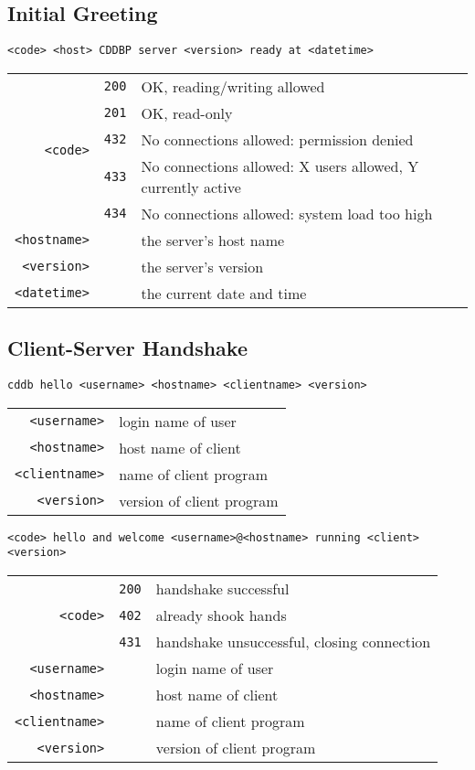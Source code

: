 \subsection{Initial Greeting}
\begin{Verbatim}[frame=single,label=\textit{From Server},showspaces=true]
<code> <host> CDDBP server <version> ready at <datetime>
\end{Verbatim}
\begin{tabular}{rcl}
\multirow{5}{3em}{\texttt{<code>}}
& \texttt{200} & OK, reading/writing allowed \\
& \texttt{201} & OK, read-only \\
& \texttt{432} & No connections allowed: permission denied \\
& \texttt{433} & No connections allowed: X users allowed, Y currently active \\
& \texttt{434} & No connections allowed: system load too high \\
\texttt{<hostname>} & & the server's host name \\
\texttt{<version>} & & the server's version \\
\texttt{<datetime>} & & the current date and time
\end{tabular}

\subsection{Client-Server Handshake}
\begin{Verbatim}[frame=single,label=\textit{To Server},showspaces=true]
cddb hello <username> <hostname> <clientname> <version>
\end{Verbatim}
\begin{tabular}{rl}
\texttt{<username>} & login name of user \\
\texttt{<hostname>} & host name of client \\
\texttt{<clientname>} & name of client program \\
\texttt{<version>} & version of client program
\end{tabular}

\begin{Verbatim}[frame=single,label=\textit{From Server},showspaces=true]
<code> hello and welcome <username>@<hostname> running <client> <version>
\end{Verbatim}
\begin{tabular}{rcl}
\multirow{3}{3em}{\texttt{<code>}}
& \texttt{200} & handshake successful \\
& \texttt{402} & already shook hands \\
& \texttt{431} & handshake unsuccessful, closing connection \\
\texttt{<username>} & & login name of user \\
\texttt{<hostname>} & & host name of client \\
\texttt{<clientname>} & & name of client program \\
\texttt{<version>} & & version of client program
\end{tabular}

